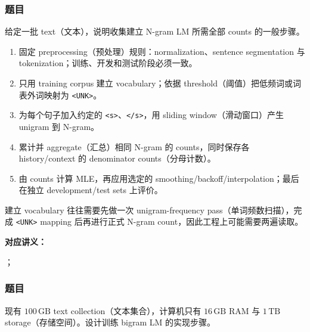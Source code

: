 \subsubsection*{题目}

给定一批 text（文本），说明收集建立 N-gram LM 所需全部 counts 的一般步骤。

\begin{checkedsolution}
\begin{enumerate}
  \item 固定 preprocessing（预处理）规则：normalization、sentence segmentation 与 tokenization；训练、开发和测试阶段必须一致。
  \item 只用 training corpus 建立 vocabulary；依据 threshold（阈值）把低频词或词表外词映射为 \texttt{<UNK>}。
  \item 为每个句子加入约定的 \texttt{<s>}、\texttt{</s>}，用 sliding window（滑动窗口）产生 unigram 到 N-gram。
  \item 累计并 aggregate（汇总）相同 N-gram 的 counts，同时保存各 history/context 的 denominator counts（分母计数）。
  \item 由 counts 计算 MLE，再应用选定的 smoothing/backoff/interpolation；最后在独立 development/test sets 上评价。
\end{enumerate}
建立 vocabulary 往往需要先做一次 unigram-frequency pass（单词频数扫描），完成 \texttt{<UNK>} mapping 后再进行正式 N-gram count，因此工程上可能需要两遍读取。
\end{checkedsolution}


\textbf{对应讲义：}\par
{}；\par
{}

\subsubsection*{题目}

现有 $100\,\mathrm{GB}$ text collection（文本集合），计算机只有 $16\,\mathrm{GB}$ RAM 与 $1\,\mathrm{TB}$ storage（存储空间）。设计训练 bigram LM 的实现步骤。

